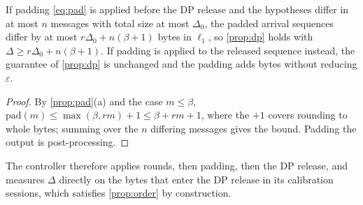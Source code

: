 \begin{proposition}\label{prop:order}
If padding \cref{eq:pad} is applied before the DP release and the hypotheses differ in at most $n$ messages with total size at most $\Delta_0$, the padded arrival sequences differ by at most $r\Delta_0+n(\beta+1)$ bytes in $\ell_1$, so \cref{prop:dp} holds with $\Delta\ge r\Delta_0+n(\beta+1)$. If padding is applied to the released sequence instead, the guarantee of \cref{prop:dp} is unchanged and the padding adds bytes without reducing $\varepsilon$.
\end{proposition}
\begin{proof}
By \cref{prop:pad}(a) and the case $m\le\beta$, $\mathrm{pad}(m)\le\max(\beta,rm)+1\le\beta+rm+1$, where the $+1$ covers rounding to whole bytes; summing over the $n$ differing messages gives the bound. Padding the output is post-processing.
\end{proof}
The controller therefore applies rounds, then padding, then the DP release, and measures $\Delta$ directly on the bytes that enter the DP release in its calibration sessions, which satisfies \cref{prop:order} by construction.
